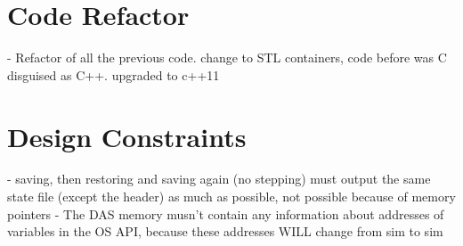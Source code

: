 {\section{Code Refactor}
- Refactor of all the previous code. change to STL containers, code before was C disguised as C++. upgraded to c++11

\section{Design Constraints}
- saving, then restoring and saving again (no stepping) must output the same state file (except the header) as much as possible, not possible because of memory pointers
- The DAS memory musn't contain any information about addresses of variables in the OS API, because these addresses WILL change from sim to sim
}
